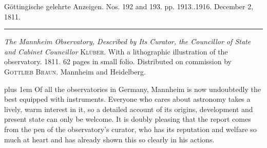 \hypertarget{native-541-lower}{}\label{native-541-lower}
\begin{center}\small Göttingische gelehrte Anzeigen. Nos. 192 and 193. pp. 1913..1916. December 2, 1811.\\[3pt]\rule{.72\linewidth}{.3pt}\end{center}

\emph{The Mannheim Observatory, Described by Its Curator, the Councillor of State and Cabinet Councillor} \textsc{Klüber}. With a lithographic illustration of the observatory. 1811. 62 pages in small folio. Distributed on commission by \textsc{Gottlieb Braun}. Mannheim and Heidelberg.

{\rightskip=0pt plus 1em
Of all the observatories in Germany, Mannheim is now undoubtedly the best equipped with instruments. Everyone who cares about astronomy takes a lively, warm interest in it, so a detailed account of its origins, development and present state can only be welcome. It is doubly pleasing that the report comes from the pen of the observatory's curator, who has its reputation and welfare so much at heart and has already shown this so clearly in his actions.\par}

